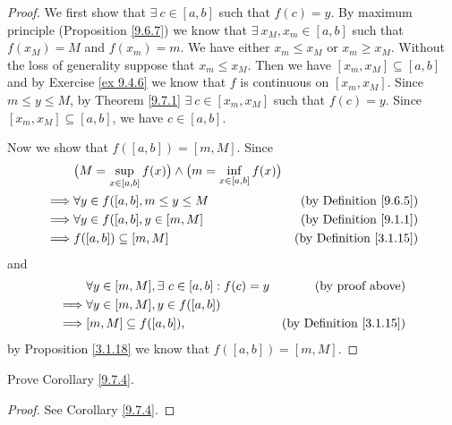 \begin{proof}
    We first show that \(\exists\ c \in [a, b]\) such that \(f(c) = y\).
    By maximum principle (Proposition \ref{9.6.7}) we know that \(\exists\ x_M, x_m \in [a, b]\) such that \(f(x_M) = M\) and \(f(x_m) = m\).
    We have either \(x_m \leq x_M\) or \(x_m \geq x_M\).
    Without the loss of generality suppose that \(x_m \leq x_M\).
    Then we have \([x_m, x_M] \subseteq [a, b]\) and by Exercise \ref{ex 9.4.6} we know that \(f\) is continuous on \([x_m, x_M]\).
    Since \(m \leq y \leq M\), by Theorem \ref{9.7.1} \(\exists\ c \in [x_m, x_M]\) such that \(f(c) = y\).
    Since \([x_m, x_M] \subseteq [a, b]\), we have \(c \in [a, b]\).

    Now we show that \(f([a, b]) = [m, M]\).
    Since
    \begin{align*}
                 & \big(M = \sup_{x \in [a, b]} f(x)\big) \land \big(m = \inf_{x \in [a, b]} f(x)\big)                                       \\
        \implies & \forall y \in f([a, b], m \leq y \leq M                                             & \text{(by Definition \ref{9.6.5})}  \\
        \implies & \forall y \in f([a, b], y \in [m, M]                                                & \text{(by Definition \ref{9.1.1})}  \\
        \implies & f([a, b]) \subseteq [m, M]                                                          & \text{(by Definition \ref{3.1.15})}
    \end{align*}
    and
    \begin{align*}
                 & \forall y \in [m, M], \exists\ c \in [a, b] : f(c) = y & \text{(by proof above)}             \\
        \implies & \forall y \in [m, M], y \in f([a, b])                                                        \\
        \implies & [m, M] \subseteq f([a, b]),                            & \text{(by Definition \ref{3.1.15})}
    \end{align*}
    by Proposition \ref{3.1.18} we know that \(f([a, b]) = [m ,M]\).
\end{proof}

\exercisesection

\begin{exercise}\label{ex 9.7.1}
    Prove Corollary \ref{9.7.4}.
\end{exercise}

\begin{proof}
    See Corollary \ref{9.7.4}.
\end{proof}

